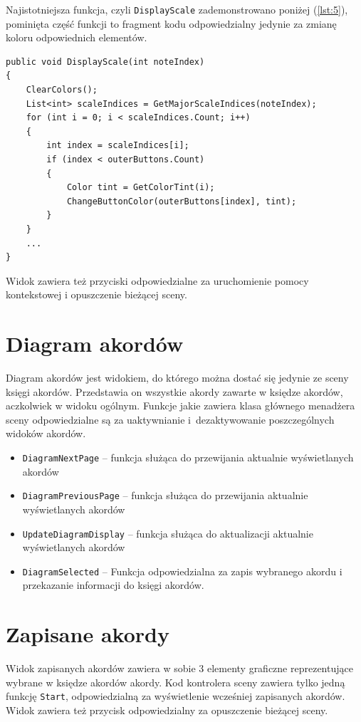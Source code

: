 Najistotniejsza funkcja, czyli \texttt{DisplayScale} zademonstrowano poniżej (\ref{lst:5}), pominięta część funkcji to fragment kodu odpowiedzialny jedynie za zmianę koloru odpowiednich elementów.

\begin{lstlisting}[style=sharpcstyle,caption=Funkcja \texttt{DisplayScale}, label=lst:5]
public void DisplayScale(int noteIndex)
{
    ClearColors();
    List<int> scaleIndices = GetMajorScaleIndices(noteIndex);
    for (int i = 0; i < scaleIndices.Count; i++)
    {
        int index = scaleIndices[i];
        if (index < outerButtons.Count)
        {
            Color tint = GetColorTint(i);
            ChangeButtonColor(outerButtons[index], tint);
        }
    }
    ...         
}
\end{lstlisting}

Widok zawiera też przyciski odpowiedzialne za uruchomienie pomocy kontekstowej i opuszczenie bieżącej sceny.

\section{Diagram akordów}

Diagram akordów jest widokiem, do którego można dostać się jedynie ze sceny księgi akordów. Przedstawia on wszystkie akordy zawarte w księdze akordów, aczkolwiek w widoku ogólnym. Funkcje jakie zawiera klasa głównego menadżera sceny odpowiedzialne są za uaktywnianie i~dezaktywowanie poszczególnych widoków akordów.

\begin{itemize}
    \item \texttt{DiagramNextPage} -- funkcja służąca do przewijania aktualnie wyświetlanych akordów
    \item \texttt{DiagramPreviousPage} -- funkcja służąca do przewijania aktualnie wyświetlanych akordów
    \item \texttt{UpdateDiagramDisplay} -- funkcja służąca do aktualizacji aktualnie wyświetlanych akordów
    \item \texttt{DiagramSelected} -- Funkcja odpowiedzialna za zapis wybranego akordu i przekazanie informacji do księgi akordów.
\end{itemize}

\section{Zapisane akordy}

Widok zapisanych akordów zawiera w sobie 3 elementy graficzne reprezentujące wybrane w księdze akordów akordy. Kod kontrolera sceny zawiera tylko jedną funkcję \texttt{Start}, odpowiedzialną za wyświetlenie wcześniej zapisanych akordów. Widok zawiera też przycisk odpowiedzialny za opuszczenie bieżącej sceny.